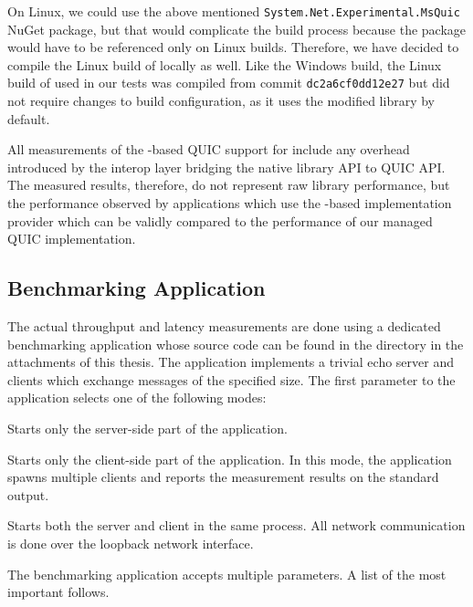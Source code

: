 On Linux, we could use the above mentioned
\texttt{System.Net\allowbreak{}.Experimental.\allowbreak{}MsQuic} NuGet package, but that would
complicate the build process because the package would have to be referenced only on Linux builds.
Therefore, we have decided to compile the Linux build of \libmsquic{} locally as well. Like the
Windows build, the Linux build of \libmsquic{} used in our tests was compiled from commit
\texttt{dc2a6cf0dd12e27} but did not require changes to build configuration, as it uses the modified
\libopenssl{} library by default.

All measurements of the \libmsquic{}-based QUIC support for \dotnet{} include any overhead
introduced by the interop layer bridging the native library API to \dotnet{} QUIC API\@. The
measured results, therefore, do not represent raw \libmsquic{} library performance, but the
performance observed by \dotnet{} applications which use the \libmsquic{}-based implementation
provider which can be validly compared to the performance of our managed QUIC implementation.

\subsection{Benchmarking Application}\label{sec:04-benchmark-app}

The actual throughput and latency measurements are done using a dedicated benchmarking \dotnet{}
application whose source code can be found in the
 directory in the attachments of this thesis.
The application implements a trivial echo server and clients which exchange messages of the
specified size. The first parameter to the application selects one of the following modes:

\begin{description}

   Starts only the server-side part of the application.

   Starts only the client-side part of the application. In this mode, the
application spawns multiple clients and reports the measurement results on the standard output.

   Starts both the server and client in the same process. All network
communication is done over the loopback network interface.

\end{description}

The benchmarking application accepts multiple parameters. A list of the most important follows.

